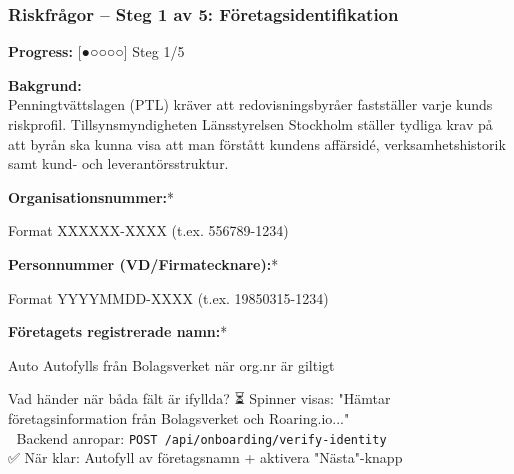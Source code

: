 \documentclass[10pt]{beamer}
\begin{document}
\begin{frame}[label=riskfragor-steg1]
  \frametitle{Riskfrågor – Steg 1 av 5: Företagsidentifikation}

  \begin{center}
    \textbf{Progress:} [●○○○○] Steg 1/5
  \end{center}

  \vspace{0.5cm}

  \small
  \textbf{Bakgrund:}\\
  Penningtvättslagen (PTL) kräver att redovisningsbyråer fastställer varje kunds riskprofil. Tillsynsmyndigheten Länsstyrelsen Stockholm ställer tydliga krav på att byrån ska kunna visa att man förstått kundens affärsidé, verksamhetshistorik samt kund- och leverantörsstruktur.

  \vspace{0.5cm}

  \textbf{Organisationsnummer:}* \underline{\hspace{6cm}}
  \begin{block}{Format}
    \footnotesize XXXXXX-XXXX (t.ex. 556789-1234)
  \end{block}

  \vspace{0.3cm}

  \textbf{Personnummer (VD/Firmatecknare):}* \underline{\hspace{6cm}}
  \begin{block}{Format}
    \footnotesize YYYYMMDD-XXXX (t.ex. 19850315-1234)
  \end{block}

  \vspace{0.3cm}

  \textbf{Företagets registrerade namn:}* \underline{\hspace{6cm}}
  \begin{block}{Auto}
    \footnotesize Autofylls från Bolagsverket när org.nr är giltigt
  \end{block}

  \vspace{0.5cm}

  \begin{alertblock}{Vad händer när båda fält är ifyllda?}
    \footnotesize
    ⏳ Spinner visas: "Hämtar företagsinformation från Bolagsverket och Roaring.io..."\\
    📡 Backend anropar: \texttt{POST /api/onboarding/verify-identity}\\
    ✅ När klar: Autofyll av företagsnamn + aktivera "Nästa"-knapp
  \end{alertblock}

  \vspace{0.5cm}
  \begin{flushright}
    \hyperlink{riskfragor-steg2}{} \hspace{0.3cm} 
  \end{flushright}
\end{frame}
\end{document}
